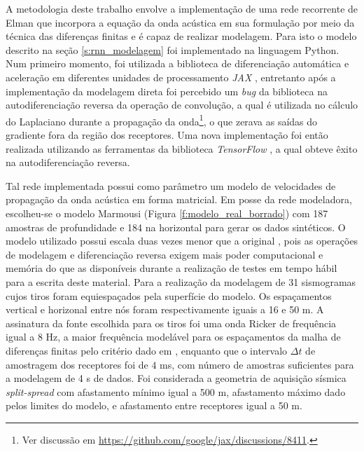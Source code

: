     A metodologia deste trabalho envolve a implementação de uma rede recorrente de Elman que incorpora a equação da onda acústica em sua formulação por meio da técnica das diferenças finitas e é capaz de realizar modelagem. Para isto o modelo descrito na seção \ref{s:rnn_modelagem} foi implementado na linguagem Python. Num primeiro momento, foi utilizada a biblioteca de diferenciação automática e aceleração em diferentes unidades de processamento \emph{JAX} , entretanto após a implementação da modelagem direta foi percebido um \textit{bug} da biblioteca na autodiferenciação reversa da operação de convolução, a qual é utilizada no cálculo do Laplaciano durante a propagação da onda\footnote{Ver discussão em \url{https://github.com/google/jax/discussions/8411}.}, o que zerava as saídas do gradiente fora da região dos receptores. Uma nova implementação foi então realizada utilizando as ferramentas da biblioteca \emph{TensorFlow} , a qual obteve êxito na autodiferenciação reversa.
    
    Tal rede implementada possui como parâmetro um modelo de velocidades de propagação da onda acústica em forma matricial. Em posse da rede modeladora, escolheu-se o modelo Marmousi (Figura \ref{f:modelo_real_borrado}) com 187 amostras de profundidade e 184 na horizontal para gerar os dados sintéticos. O modelo utilizado possui escala duas vezes menor que a original , pois as operações de modelagem e diferenciação reversa exigem mais poder computacional e memória do que as disponíveis durante a realização de testes em tempo hábil para a escrita deste material. Para a realização da modelagem de 31 sismogramas cujos tiros foram equiespaçados pela superfície do modelo. Os espaçamentos vertical e horizonal entre nós foram respectivamente iguais a 16 e 50 m. A assinatura da fonte escolhida para os tiros foi uma onda Ricker de frequência igual a 8 Hz, a maior frequência modelável para os espaçamentos da malha de diferenças finitas pelo critério dado em , enquanto que o intervalo $\Delta t$ de amostragem dos receptores foi de $4$ ms, com número de amostras suficientes para a modelagem de 4 s de dados. Foi considerada a geometria de aquisição sísmica \textit{split-spread} com afastamento mínimo igual a 500 m, afastamento máximo dado pelos limites do modelo, e afastamento entre receptores igual a 50 m.

